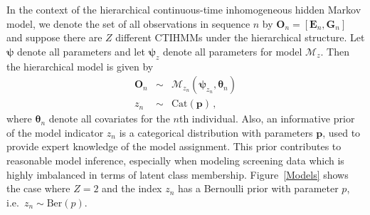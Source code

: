 \documentclass{article}
\begin{document}
In the context of the hierarchical continuous-time inhomogeneous hidden Markov model, we denote the set of all observations in sequence $n$ by $\bm O_n = [\bm E_n, \bm G_n]$ and suppose there are $Z$ different CTIHMMs under the hierarchical structure. Let $\bm \psi$ denote all parameters and let $\bm \psi_z$ denote all parameters for model $\mathcal{M}_z$. Then the hierarchical model is given by
\begin{eqnarray*}
	\bm O_n & \sim & \mathcal{M}_{z_n}(\bm \psi_{z_n}, \bm \theta_n) \\
	z_n & \sim & \mathrm{Cat}(\bm p)\,, 
\end{eqnarray*}
where $\bm \theta_n$ denote all covariates for the $n$th individual. Also, an informative prior of the model indicator $z_n$ is a categorical distribution with parameters $\bm p$, used to provide expert knowledge of the model assignment. This prior contributes to reasonable model inference, especially when modeling screening data which is highly imbalanced in terms of latent class membership.    Figure~\ref{Models} shows the case where $Z=2$ and the index $z_n$ has a Bernoulli prior with parameter $p$, i.e.\ $z_n \sim \mathrm{Ber}(p)$.
\end{document}
